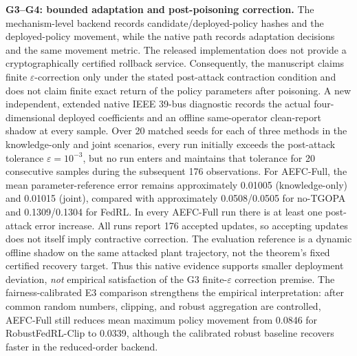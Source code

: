 \textbf{G3--G4: bounded adaptation and post-poisoning correction.}
The mechanism-level backend records candidate/deployed-policy hashes and the deployed-policy movement, while the native path records adaptation decisions and the same movement metric. The released implementation does not provide a cryptographically certified rollback service. Consequently, the manuscript claims finite $\varepsilon$-correction only under the stated post-attack contraction condition and does not claim finite exact return of the policy parameters after poisoning. A new independent, extended native IEEE 39-bus diagnostic records the actual four-dimensional deployed coefficients and an offline same-operator clean-report shadow at every sample. Over 20 matched seeds for each of three methods in the knowledge-only and joint scenarios, every run initially exceeds the post-attack tolerance $\varepsilon=10^{-3}$, but no run enters and maintains that tolerance for 20 consecutive samples during the subsequent 176 observations. For AEFC-Full, the mean parameter-reference error remains approximately 0.01005 (knowledge-only) and 0.01015 (joint), compared with approximately 0.0508/0.0505 for no-TGOPA and 0.1309/0.1304 for FedRL. In every AEFC-Full run there is at least one post-attack error increase. All runs report 176 accepted updates, so accepting updates does not itself imply contractive correction. The evaluation reference is a dynamic offline shadow on the same attacked plant trajectory, not the theorem's fixed certified recovery target. Thus this native evidence supports smaller deployment deviation, \emph{not} empirical satisfaction of the G3 finite-$\varepsilon$ correction premise. The fairness-calibrated E3 comparison strengthens the empirical interpretation: after common random numbers, clipping, and robust aggregation are controlled, AEFC-Full still reduces mean maximum policy movement from 0.0846 for RobustFedRL-Clip to 0.0339, although the calibrated robust baseline recovers faster in the reduced-order backend.


